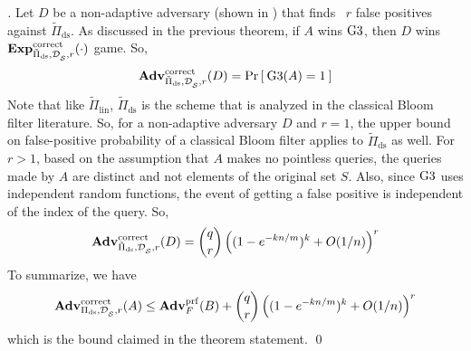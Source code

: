 \begin{proof}[]
Let $D$ be a non-adaptive adversary (shown in ) that finds ~$r$ false positives against $\tilde{\Pi}_{\mathrm{ds}}$. As discussed in the previous theorem, if $A$ wins $\text{G3}$, then $D$ wins $\mathrm{\mathbf{Exp}}^{\mathrm{correct}}_{\tilde{\Pi}_{\mathrm{ds}},\mathcal{D}_{{\cal S}}^{},r}(\cdot)$ game. So, 
\begin{equation*}
\mathrm{\mathbf{Adv}}^{\mathrm{correct}}_{\tilde{\Pi}_{\mathrm{ds}},\mathcal{D}_{{\cal S}}^{},r}(D) = \Pr\left[\: \text{G3}(A) = 1 \:\right]\label{eq:2T8}
\end{equation*}
Note that like $\tilde{\Pi}_{\mathrm{lin}}$, $\tilde{\Pi}_{\mathrm{ds}}$ is the scheme that is analyzed in the classical Bloom filter literature. So, for a non-adaptive adversary $D$ and $r=1$, the upper bound on false-positive probability of a classical Bloom filter applies to $\tilde{\Pi}_{\mathrm{ds}}$ as well. For $r > 1$, based on the assumption that $A$ makes no pointless queries, the queries made by $A$ are distinct and not elements of the original set $S$. Also, since $\text{G3}$ uses independent random functions, the event of getting a false positive is independent of the index of the query. So,
\begin{equation*}
\mathrm{\mathbf{Adv}}^{\mathrm{correct}}_{\tilde{\Pi}_{\mathrm{ds}},\mathcal{D}_{{\cal S}}^{},r}(D) =   {\dbinom{q}{r}} \left( (1-e^{-kn/m})^k + O(1/n) \right)^r
\end{equation*}
\noindent
To summarize, we have
\[
\mathrm{\mathbf{Adv}}^{\mathrm{correct}}_{\Pi_{\mathrm{ds}},\mathcal{D}_{{\cal S}}^{},r}(A) \leq  \mathbf{Adv}^{\mathrm{prf}}_{F}(B)  + {\dbinom{q}{r}} \left( (1-e^{-kn/m})^k + O(1/n) \right)^r
\]
which is the bound claimed in the theorem statement. \hfill \qed


\end{proof}
